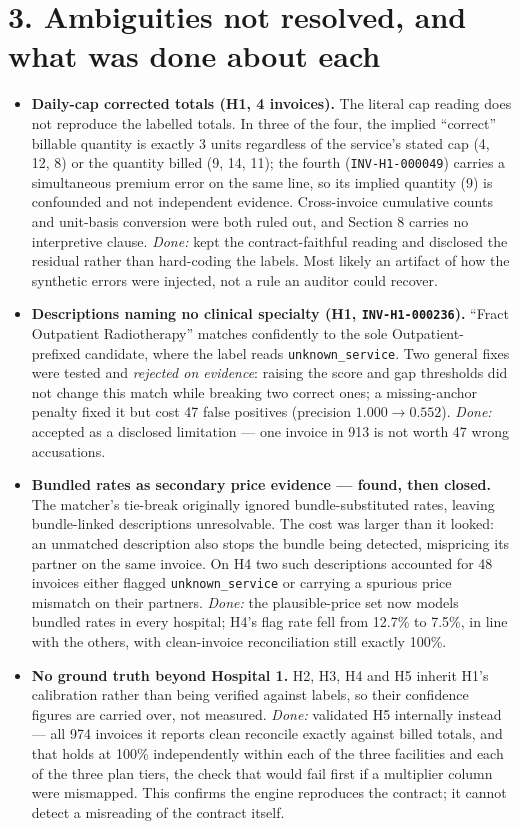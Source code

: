 \documentclass[10pt,a4paper]{article}
\begin{document}
\section*{\normalsize 3.\; Ambiguities not resolved, and what was done about each}
\vspace{-4pt}
\begin{itemize}
\item \textbf{Daily-cap corrected totals (H1, 4 invoices).} The literal cap reading does not reproduce the
labelled totals. In three of the four, the implied ``correct'' billable quantity is exactly 3 units
regardless of the service's stated cap (4, 12, 8) or the quantity billed (9, 14, 11); the fourth
(\texttt{INV-H1-000049}) carries a simultaneous premium error on the same line, so its implied quantity (9)
is confounded and not independent evidence. Cross-invoice cumulative counts and unit-basis conversion were
both ruled out, and Section 8 carries no interpretive clause. \emph{Done:} kept the contract-faithful
reading and disclosed the residual rather than hard-coding the labels. Most likely an artifact of how the
synthetic errors were injected, not a rule an auditor could recover.
\item \textbf{Descriptions naming no clinical specialty (H1, \texttt{INV-H1-000236}).} ``Fract Outpatient
Radiotherapy'' matches confidently to the sole Outpatient-prefixed candidate, where the label reads
\texttt{unknown\_service}. Two general fixes were tested and \emph{rejected on evidence}: raising the score
and gap thresholds did not change this match while breaking two correct ones; a missing-anchor penalty fixed
it but cost 47 false positives (precision $1.000\to0.552$). \emph{Done:} accepted as a disclosed limitation
--- one invoice in 913 is not worth 47 wrong accusations.
\item \textbf{Bundled rates as secondary price evidence --- found, then closed.} The matcher's tie-break originally ignored bundle-substituted rates, leaving bundle-linked descriptions unresolvable. The cost was larger than it looked: an unmatched description also stops the bundle being detected, mispricing its partner on the same invoice. On H4 two such descriptions accounted for 48 invoices either flagged \texttt{unknown\_service} or carrying a spurious price mismatch on their partners. \emph{Done:} the plausible-price set now models bundled rates in every hospital; H4's flag rate fell from 12.7\% to 7.5\%, in line with the others, with clean-invoice reconciliation still exactly 100\%.
\item \textbf{No ground truth beyond Hospital 1.} H2, H3, H4 and H5 inherit H1's calibration rather than being
verified against labels, so their confidence figures are carried over, not measured. \emph{Done:} validated
H5 internally instead --- all 974 invoices it reports clean reconcile exactly against billed totals, and that
holds at 100\% independently within each of the three facilities and each of the three plan tiers, the check
that would fail first if a multiplier column were mismapped. This confirms the engine reproduces the
contract; it cannot detect a misreading of the contract itself.
\end{itemize}
\end{document}
